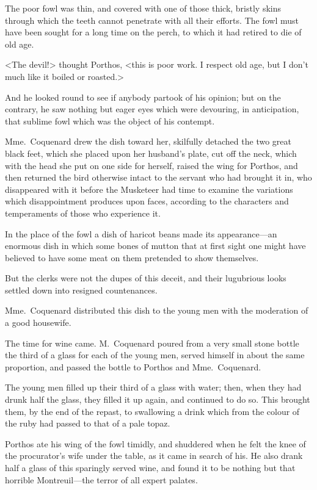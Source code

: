 The poor fowl was thin, and covered with one of those thick, bristly skins through which the teeth cannot penetrate with all their efforts. The fowl must have been sought for a long time on the perch, to which it had retired to die of old age. 

<The devil!> thought Porthos, <this is poor work. I respect old age, but I don't much like it boiled or roasted.> 

And he looked round to see if anybody partook of his opinion; but on the contrary, he saw nothing but eager eyes which were devouring, in anticipation, that sublime fowl which was the object of his contempt. 

Mme.~Coquenard drew the dish toward her, skilfully detached the two great black feet, which she placed upon her husband's plate, cut off the neck, which with the head she put on one side for herself, raised the wing for Porthos, and then returned the bird otherwise intact to the servant who had brought it in, who disappeared with it before the Musketeer had time to examine the variations which disappointment produces upon faces, according to the characters and temperaments of those who experience it. 

In the place of the fowl a dish of haricot beans made its appearance—an enormous dish in which some bones of mutton that at first sight one might have believed to have some meat on them pretended to show themselves. 

But the clerks were not the dupes of this deceit, and their lugubrious looks settled down into resigned countenances. 

Mme.~Coquenard distributed this dish to the young men with the moderation of a good housewife. 

The time for wine came. M.~Coquenard poured from a very small stone bottle the third of a glass for each of the young men, served himself in about the same proportion, and passed the bottle to Porthos and Mme.~Coquenard. 

The young men filled up their third of a glass with water; then, when they had drunk half the glass, they filled it up again, and continued to do so. This brought them, by the end of the repast, to swallowing a drink which from the colour of the ruby had passed to that of a pale topaz. 

Porthos ate his wing of the fowl timidly, and shuddered when he felt the knee of the procurator's wife under the table, as it came in search of his. He also drank half a glass of this sparingly served wine, and found it to be nothing but that horrible Montreuil—the terror of all expert palates. 

